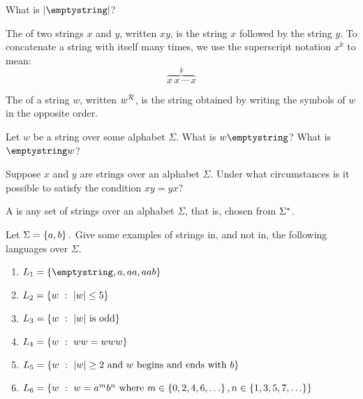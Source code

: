 \begin{exer}
What is $|\emptystring|$?
\end{exer}

\begin{defn}
The  of two strings $x$ and $y$, written $xy$, is the string $x$ followed by the string $y$. To concatenate a string with itself many times, we use the superscript notation $x^k$ to mean:
\[\overbrace{x\,x\,\cdots\,x}^k\]
\end{defn}

\begin{defn}
The  of a string $w$, written $w^{\mathcal{R}}$, is the string obtained by writing the symbols of $w$ in the opposite order.
\end{defn}

\begin{exer}
Let $w$ be a string over some alphabet $\Sigma$. What is $w\emptystring$? What is $\emptystring w$?
\end{exer}

\begin{exer}
Suppose $x$ and $y$ are strings over an alphabet $\Sigma$. Under what circumstances is it possible to satisfy the condition $xy = yx$? 
\end{exer}

\begin{defn}[Language]
A  is any set of strings over an alphabet $\Sigma$, that is, chosen from $\Sigma^{*}$.
\end{defn}

\begin{exer}
Let $\Sigma = \left\lbrace a, b \right\rbrace.$ Give some examples of strings in, and not in, the following languages over $\Sigma$.
\begin{enumerate}[label=(\alph*)]
\item $L_1 = \setdef{ \emptystring, a, aa, aab }$
\item $L_2 = \left\lbrace w\ :\ |w| \leq 5 \right\rbrace$
\item $L_3 = \left\lbrace w\ :\ |w|~\textrm{is odd} \right\rbrace$
\item $L_4 = \left\lbrace w\ :\ ww = www \right\rbrace$
\item $L_5 = \left\lbrace w\ :\ |w| \geq 2 ~\textrm{and $w$ begins and ends with $b$} \right\rbrace$
\item $L_6 = \left\lbrace w\ :\ w = a^m b^n ~\textrm{where}~ m \in \left\lbrace 0, 2, 4, 6, \ldots \right\rbrace, n \in \left\lbrace 1, 3, 5, 7, \ldots \right\rbrace \right\rbrace$
\end{enumerate}
\end{exer}

